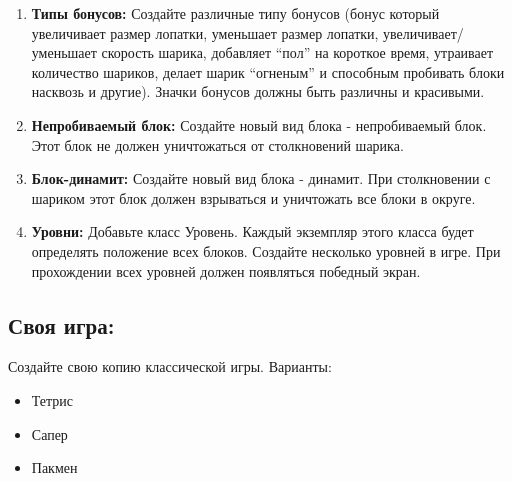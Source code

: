 \documentclass{article}
\begin{document}
\begin{enumerate}
\item \textbf{Типы бонусов:} 
Создайте различные типу бонусов (бонус который увеличивает размер лопатки, уменьшает размер лопатки, увеличивает/уменьшает скорость шарика, добавляет ``пол'' на короткое время, утраивает количество шариков, делает шарик ``огненым'' и способным пробивать блоки насквозь и другие). Значки бонусов должны быть различны и красивыми.
\item \textbf{Непробиваемый блок:} Создайте новый вид блока - непробиваемый блок. Этот блок не должен уничтожаться от столкновений шарика.
\item \textbf{Блок-динамит:} Создайте новый вид блока - динамит. При столкновении с шариком этот блок должен взрываться и уничтожать все блоки в округе.
\item \textbf{Уровни:} Добавьте класс Уровень. Каждый экземпляр этого класса будет определять положение всех блоков. Создайте несколько уровней в игре. При прохождении всех уровней должен появляться победный экран.
\end{enumerate}

\newpage
\subsection*{Своя игра:}
Создайте свою копию классической игры. Варианты:
\begin{itemize}
\item Тетрис
\item Сапер
\item Пакмен
\end{itemize}
\end{document}
